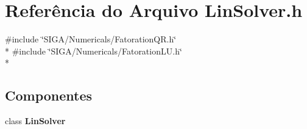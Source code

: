\section{Referência do Arquivo Lin\+Solver.\+h}
\label{_lin_solver_8h}
{\ttfamily \#include \char`\"{}S\+I\+G\+A/\+Numericals/\+Fatoration\+Q\+R.\+h\char`\"{}}\\*
{\ttfamily \#include \char`\"{}S\+I\+G\+A/\+Numericals/\+Fatoration\+L\+U.\+h\char`\"{}}\\*
\subsection*{Componentes}
\begin{DoxyCompactItemize}
\item 
class {\bf Lin\+Solver}
\end{DoxyCompactItemize}
